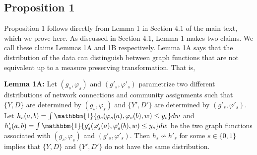 \documentclass[12pt]{article}
\theoremstyle{definition}
\begin{document}
\subsection{Proposition 1}
Proposition 1 follows directly from Lemma 1 in Section 4.1 of the main text, which we prove here. As discussed in Section 4.1, Lemma 1 makes two claims. We call these claims Lemmas 1A and 1B respectively. Lemma 1A says that the distribution of the data can distinguish between graph functions that are not equivalent up to a measure preserving transformation. That is,  
\begin{flushleft}
\textbf{Lemma 1A:} Let $(g_{s},\varphi_{s})$ and $(g'_{s},\varphi'_{s})$ parametrize two different distributions of network connections and community assignments such that $\{Y,D\}$ are determined by $(g_{s},\varphi_{s})$ and $\{Y',D'\}$ are determined by $(g'_{s},\varphi'_{s})$. Let $h_{s}(a,b) =  \int \mathbbm{1}\{g_{s}(\varphi_s(a),\varphi_s(b),w) \leq y_s\}dw$ and $h'_{s}(a,b) =  \int \mathbbm{1}\{g'_{s}(\varphi'_s(a),\varphi'_s(b),w) \leq y_s\}dw$ be the two graph functions associated with $(g_{s},\varphi_{s})$ and $(g'_{s},\varphi'_{s})$.  Then $h_{s} \not\sim h'_{s}$ for some $s \in \{0,1\}$ implies that $\{Y,D\}$ and $\{Y',D'\}$ do not have the same distribution. 
\end{flushleft}
\end{document}
